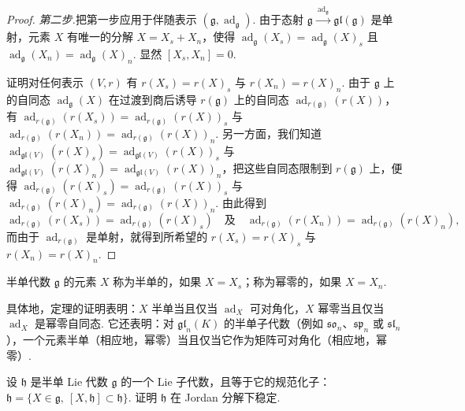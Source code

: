 \begin{numpara}[Jordan 分解]
\begin{proof}
\emph{第二步.}把第一步应用于伴随表示 $(\mathfrak g,\operatorname{ad}_{\mathfrak g})$. 由于态射 $\mathfrak g\xrightarrow{\ \operatorname{ad}_{\mathfrak g}\ }\mathfrak{gl}(\mathfrak g)$ 是单射，元素 $X$ 有唯一的分解 $X=X_s+X_n$，使得 $\operatorname{ad}_{\mathfrak g}(X_s)=\operatorname{ad}_{\mathfrak g}(X)_s$ 且 $\operatorname{ad}_{\mathfrak g}(X_n)=\operatorname{ad}_{\mathfrak g}(X)_n$. 显然 $[X_s,X_n]=0$.

证明对任何表示 $(V,r)$ 有 $r(X_s)=r(X)_s$ 与 $r(X_n)=r(X)_n$. 由于 $\mathfrak g$ 上的自同态 $\operatorname{ad}_{\mathfrak g}(X)$ 在过渡到商后诱导 $r(\mathfrak g)$ 上的自同态 $\operatorname{ad}_{r(\mathfrak g)}(r(X))$，有 $\operatorname{ad}_{r(\mathfrak g)}(r(X_s))=\operatorname{ad}_{r(\mathfrak g)}(r(X))_s$ 与 $\operatorname{ad}_{r(\mathfrak g)}(r(X_n))=\operatorname{ad}_{r(\mathfrak g)}(r(X))_n$. 另一方面，我们知道 $\operatorname{ad}_{\mathfrak{gl}(V)}(r(X)_s)=\operatorname{ad}_{\mathfrak{gl}(V)}(r(X))_s$ 与 $\operatorname{ad}_{\mathfrak{gl}(V)}(r(X)_n)=\operatorname{ad}_{\mathfrak{gl}(V)}(r(X))_n$，把这些自同态限制到 $r(\mathfrak g)$ 上，便得 $\operatorname{ad}_{r(\mathfrak g)}(r(X)_s)=\operatorname{ad}_{r(\mathfrak g)}(r(X))_s$ 与 $\operatorname{ad}_{r(\mathfrak g)}(r(X)_n)=\operatorname{ad}_{r(\mathfrak g)}(r(X))_n$. 由此得到
\[\operatorname{ad}_{r(\mathfrak g)}(r(X_s))=\operatorname{ad}_{r(\mathfrak g)}(r(X)_s)\quad\text{及}\quad\operatorname{ad}_{r(\mathfrak g)}(r(X_n))=\operatorname{ad}_{r(\mathfrak g)}(r(X)_n),\]
而由于 $\operatorname{ad}_{r(\mathfrak g)}$ 是单射，就得到所希望的 $r(X_s)=r(X)_s$ 与 $r(X_n)=r(X)_n$.
\end{proof}
\begin{definition*}
半单代数 $\mathfrak g$ 的元素 $X$ 称为半单的，如果 $X=X_s$；称为幂零的，如果 $X=X_n$.
\end{definition*}
具体地，定理的证明表明：$X$ 半单当且仅当 $\operatorname{ad}_X$ 可对角化，$X$ 幂零当且仅当 $\operatorname{ad}_X$ 是幂零自同态. 它还表明：对 $\mathfrak{gl}_n(K)$ 的半单子代数（例如 $\mathfrak{so}_n$、$\mathfrak{sp}_n$ 或 $\mathfrak{sl}_n$），一个元素半单（相应地，幂零）当且仅当它作为矩阵可对角化（相应地，幂零）.
\begin{exercise*}
设 $\mathfrak h$ 是半单 Lie 代数 $\mathfrak g$ 的一个 Lie 子代数，且等于它的规范化子：$\mathfrak h=\{X\in\mathfrak g,\ [X,\mathfrak h]\subset\mathfrak h\}$. 证明 $\mathfrak h$ 在 Jordan 分解下稳定.
\end{exercise*}
\end{numpara}

